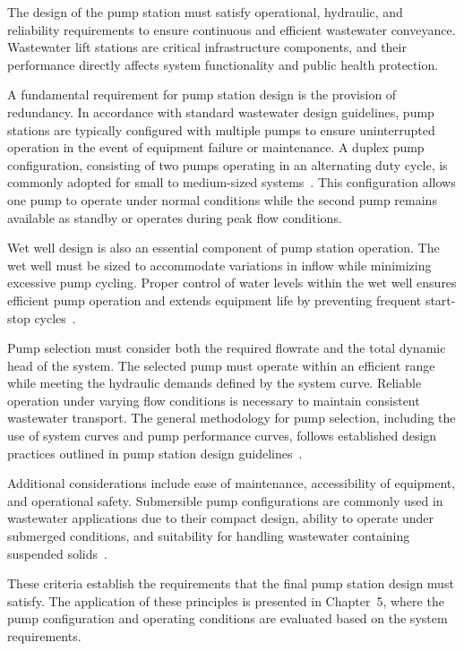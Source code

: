 The design of the pump station must satisfy operational, hydraulic, and reliability requirements to ensure continuous and efficient wastewater conveyance. Wastewater lift stations are critical infrastructure components, and their performance directly affects system functionality and public health protection.

A fundamental requirement for pump station design is the provision of redundancy. In accordance with standard wastewater design guidelines, pump stations are typically configured with multiple pumps to ensure uninterrupted operation in the event of equipment failure or maintenance. A duplex pump configuration, consisting of two pumps operating in an alternating duty cycle, is commonly adopted for small to medium-sized systems~\cite{TenStates_RecommendedStandards_2014,MDEQ_DesignGuidance_2025}. This configuration allows one pump to operate under normal conditions while the second pump remains available as standby or operates during peak flow conditions.

Wet well design is also an essential component of pump station operation. The wet well must be sized to accommodate variations in inflow while minimizing excessive pump cycling. Proper control of water levels within the wet well ensures efficient pump operation and extends equipment life by preventing frequent start-stop cycles~\cite{TenStates_RecommendedStandards_2014}.

Pump selection must consider both the required flowrate and the total dynamic head of the system. The selected pump must operate within an efficient range while meeting the hydraulic demands defined by the system curve. Reliable operation under varying flow conditions is necessary to maintain consistent wastewater transport. The general methodology for pump selection, including the use of system curves and pump performance curves, follows established design practices outlined in pump station design guidelines~\cite{Jensen_PumpStationDesignGuidelines_2012}.

Additional considerations include ease of maintenance, accessibility of equipment, and operational safety. Submersible pump configurations are commonly used in wastewater applications due to their compact design, ability to operate under submerged conditions, and suitability for handling wastewater containing suspended solids~\cite{MDEQ_DesignGuidance_2025}.

These criteria establish the requirements that the final pump station design must satisfy. The application of these principles is presented in Chapter~5, where the pump configuration and operating conditions are evaluated based on the system requirements.


